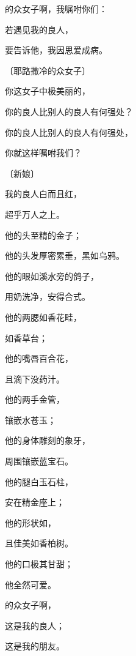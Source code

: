 {\par }{\Q {}的众女子啊，我嘱咐你们：
\par }{\Q 若遇见我的良人，
\par }{\Q 要告诉他，我因思爱成病。
\par }{\SP 〔耶路撒冷的众女子〕
\par }{\Q {}你这女子中极美丽的，
\par }{\Q 你的良人比别人的良人有何强处？
\par }{\Q 你的良人比别人的良人有何强处，
\par }{\Q 你就这样嘱咐我们？
\par }{\SP 〔新娘〕
\par }{\Q {}我的良人白而且红，
\par }{\Q 超乎万人之上。
\par }{\Q {}他的头{}至精的金子；
\par }{\Q 他的头发厚密累垂，黑如乌鸦。
\par }{\Q {}他的眼如溪水旁的鸽子{}，
\par }{\Q 用奶洗净，安得合式。
\par }{\Q {}他的两腮如香花畦，
\par }{\Q 如香草台；
\par }{\Q 他的嘴唇{}百合花，
\par }{\Q 且滴下没药汁。
\par }{\Q {}他的两手{}金管，
\par }{\Q 镶嵌水苍玉；
\par }{\Q 他的身体{}雕刻的象牙，
\par }{\Q 周围镶嵌蓝宝石。
\par }{\Q {}他的腿{}白玉石柱，
\par }{\Q 安在精金座上；
\par }{\Q 他的形状如{}，
\par }{\Q 且佳美如香柏树。
\par }{\Q {}他的口极其甘甜；
\par }{\Q 他全然可爱。
\par }{的众女子啊，
\par }{\Q 这是我的良人；
\par }{\Q 这是我的朋友。

}
